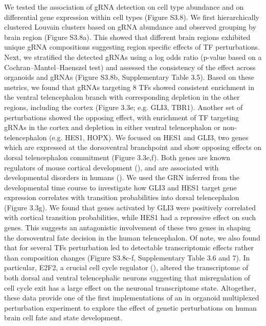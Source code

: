 We tested the association of gRNA detection on cell type abundance and on differential gene expression within cell types (Figure S3.8). We first hierarchically clustered Louvain clusters based on gRNA abundance and observed grouping by brain region (Figure S3.8a). This showed that different brain regions exhibited unique gRNA compositions suggesting region specific effects of TF perturbations. Next, we stratified the detected gRNAs using a log odds ratio (p-value based on a Cochran–Mantel–Haenszel test) and assessed the consistency of the effect across organoids and gRNAs (Figure S3.8b, Supplementary Table 3.5). Based on these metrics, we found that gRNAs targeting 8 TFs showed consistent enrichment in the ventral telencephalon branch with corresponding depletion in the other regions, including the cortex (Figure 3.3e; e.g. GLI3, TBR1). Another set of perturbations showed the opposing effect, with enrichment of TF targeting gRNAs in the cortex and depletion in either ventral telencephalon or non-telencephalon (e.g. HES1, HOPX). We focused on HES1 and GLI3, two genes which are expressed at the dorsoventral branchpoint and show opposing effects on dorsal telencephalon commitment (Figure 3.3e,f). Both genes are known regulators of mouse cortical development (\cite{nakamura_bhlh_2000,wang_gli3_2011,hasenpusch-theil_gli3_2018}), and are associated with developmental disorders in humans (\cite{song_non-coding_2021,biesecker_greig_2008}). We used the GRN inferred from the developmental time course to investigate how GLI3 and HES1 target gene expression correlates with transition probabilities into dorsal telencephalon (Figure 3.3g). We found that genes activated by GLI3 were positively correlated with cortical transition probabilities, while HES1 had a repressive effect on such genes. This suggests an antagonistic involvement of these two genes in shaping the dorsoventral fate decision in the human telencephalon. Of note, we also found that for several TFs perturbation led to detectable transcriptomic effects rather than composition changes (Figure S3.8c-f, Supplementary Table 3.6 and 7). In particular, E2F2, a crucial cell cycle regulator (\cite{swiss_cell-context_2010}), altered the transcriptome of both dorsal and ventral telencephalic neurons suggesting that misregulation of cell cycle exit has a large effect on the neuronal transcriptome state. Altogether, these data provide one of the first implementations of an in organoid multiplexed perturbation experiment to explore the effect of genetic perturbations on human brain cell fate and state development.



